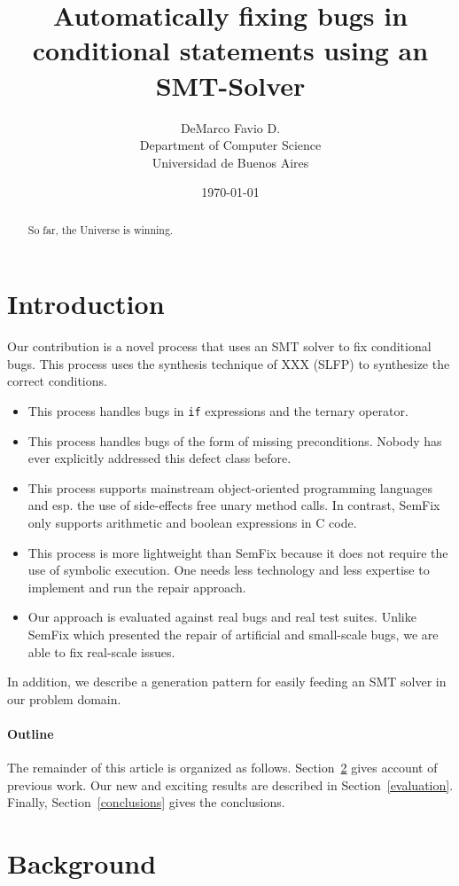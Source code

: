 \documentclass[a4paper,10pt,twocolumn]{article}
\date{\today}
\title{Automatically fixing bugs in conditional statements using an SMT-Solver}
\author{
        DeMarco Favio D. \\
                Department of Computer Science\\
		Universidad de Buenos Aires
}
\begin{document}
\maketitle

\begin{abstract}
So far, the Universe is winning.
\end{abstract}

\section{Introduction}

Our contribution is a novel process that uses an SMT solver to fix conditional bugs.
 This process uses the synthesis technique of XXX (SLFP) to synthesize the correct conditions.
\begin{itemize}
 \item This process handles bugs in \texttt{if} expressions and the ternary operator.
 \item This process handles bugs of the form of missing preconditions. Nobody has ever explicitly addressed this defect class before.
 \item This process supports mainstream object-oriented programming languages and esp. the use of side-effects free unary method calls. In contrast, SemFix only supports arithmetic and boolean expressions in C code.
 \item This process is more lightweight than SemFix because it does not require the use of symbolic execution. One needs less technology and less expertise to implement and run the repair approach.
 \item Our approach is evaluated against real bugs and real test suites. Unlike SemFix which presented the repair of artificial and small-scale bugs, we are able to fix real-scale issues.
\end{itemize}

In addition, we describe a generation pattern for easily feeding an SMT solver in our problem domain.

\paragraph{Outline}
The remainder of this article is organized as follows.
Section~\ref{background} gives account of previous work.
Our new and exciting results are described in Section~\ref{evaluation}.
Finally, Section~\ref{conclusions} gives the conclusions.

\section{Background}
\label{background}
\end{document}
